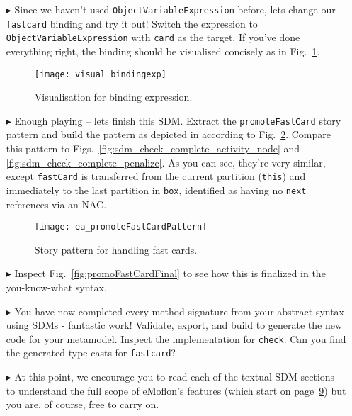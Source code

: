 \begin{itemize}
\item[$\blacktriangleright$] Since we haven't used \texttt{ObjectVariableExpression} before, lets change our \texttt{fastcard} binding and try it out! Switch
the expression to \texttt{ObjectVariableExpression} with \texttt{card} as the target. If you've done everything right, the binding should be visualised
concisely as in Fig.~\ref{fig:sdm_fastcard_4}.
 
 \vspace{0.5cm}
 
\begin{figure}[htbp]
\begin{center}
  \texttt{[image: visual\_bindingexp]}
  \caption{Visualisation for binding expression.}  
  \label{fig:sdm_fastcard_4}
\end{center}
\end{figure}

\clearpage

\item[$\blacktriangleright$] Enough playing -- lets finish this SDM. Extract the \texttt{promoteFastCard} story pattern and build the pattern as
depicted in according to Fig.~\ref{fig:promoteFastCardPattern}. Compare this pattern to Figs.~\ref{fig:sdm_check_complete_activity_node} and
\ref{fig:sdm_check_complete_penalize}. As you can see, they're very similar, except \texttt{fastCard} is transferred from the current partition (\texttt{this})
and immediately to the last partition in \texttt{box}, identified as having no \texttt{next} references via an NAC.

\vspace{0.5cm}

\begin{figure}[htbp]
\begin{center}
  \texttt{[image: ea\_promoteFastCardPattern]}
  \caption{Story pattern for handling fast cards.}  
  \label{fig:promoteFastCardPattern}
\end{center}
\end{figure}

\vspace{0.5cm}

\item[$\blacktriangleright$] Inspect Fig.~\ref{fig:promoFastCardFinal} to see how this is finalized in the you-know-what syntax.

\item[$\blacktriangleright$] You have now completed every method signature from your abstract syntax using SDMs - fantastic work! Validate, export, and build to
generate the new code for your metamodel. Inspect the implementation for \texttt{check}.  Can you find the generated type casts for \texttt{fastcard}?

\item[$\blacktriangleright$] At this point, we encourage you to read each of the textual SDM sections to understand the full scope of eMoflon's features
(which start on page~\hyperlink{page.9}{9}) but you are, of course, free to carry on.


\end{itemize}
